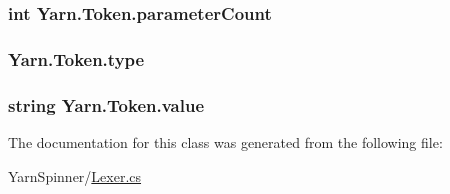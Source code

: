 \hypertarget{a00149_adf11c0d29b66935a8d8109d6308d0488}{
\subsubsection[{parameter\-Count}]{\setlength{\rightskip}{0pt plus 5cm}int Yarn.\-Token.\-parameter\-Count}}\label{a00149_adf11c0d29b66935a8d8109d6308d0488}
\hypertarget{a00149_a471a25da67fda0524f2375f9a882aafa}{
\subsubsection[{type}]{ Yarn.\-Token.\-type}}\label{a00149_a471a25da67fda0524f2375f9a882aafa}
\hypertarget{a00149_a3df6b32d6190a639619a3f064c2154e2}{
\subsubsection[{value}]{\setlength{\rightskip}{0pt plus 5cm}string Yarn.\-Token.\-value}}\label{a00149_a3df6b32d6190a639619a3f064c2154e2}


The documentation for this class was generated from the following file\-:\begin{DoxyCompactItemize}
\item 
Yarn\-Spinner/\hyperlink{a00266}{Lexer.\-cs}\end{DoxyCompactItemize}
